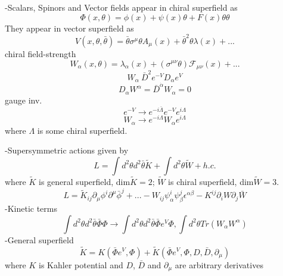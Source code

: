 \documentclass[type = bachelor]{fduthesis-en}
\begin{document}
\bigskip
\noindent-Scalars, Spinors and Vector fields appear in chiral superfield as
\begin{equation}
\Phi(x,\theta)=\phi(x)+\psi(x)\theta+F(x)\theta\theta
\end{equation}
They appear in vector superfield as 
\begin{equation}
V(x, \theta, \bar{\theta})=\bar{\theta}\sigma^{\mu}\theta A_{\mu}(x)+\bar{\theta}^2\theta\lambda(x)+...
\end{equation}
chiral field-strength 
\begin{equation}
W_{\alpha}(x,\theta)=\lambda_{\alpha}(x)+(\sigma^{\mu\nu}\theta)\mathcal{F}_{\mu\nu}(x)+...
\end{equation}
\begin{equation}
W_{\alpha}~\bar{D}^2e^{-V}D_{\alpha}e^V
\end{equation}
\begin{equation}
D_{\alpha}W^{\alpha}=\bar{D}^{\dot{\alpha}}W_{\alpha}=0
\end{equation}
gauge inv.
\begin{equation}
e^{-V} \rightarrow e^{-i\bar{\Lambda}}e^{-V}e^{i\Lambda}
\end{equation}
\begin{equation}
W_{\alpha} \rightarrow e^{-i\Lambda}W_{\alpha}e^{i\Lambda}
\end{equation}
where $\Lambda$ is some chiral superfield.

\bigskip
-Supersymmetric actions given by 
\begin{equation}
L = \int d^2\theta d^2\bar{\theta}\widetilde{K}+\int d^2\theta \widetilde{W}+h.c.
\end{equation}
where $\widetilde{K}$ is general superfield, dim$\widetilde{K}=2$; $\widetilde{W}$ is chiral superfield, dim$\widetilde{W}=3$.
\begin{equation}
L = \widetilde{K}_{ij}\partial_{\mu}\phi^{i}\partial^{\mu}\bar{\phi}^j+...-W_{ij}\psi^i_{\alpha}\psi^j_{\beta}\epsilon^{\alpha\beta}-K^{ij}\partial_iW\partial_j\bar{W}
\end{equation}
-Kinetic terms
\begin{equation}
\int d^2\theta d^2\bar{\theta} \bar{\Phi}\Phi \longrightarrow \int d^2\theta d^2\bar{\theta} \bar{\Phi}e^V\Phi, \int d^2\theta Tr(W_{\alpha}W^{\alpha})
\end{equation}
-General superfield
\begin{equation}
\widetilde{K}=K(\bar{\Phi}e^V, \Phi)+\widetilde{K}(\bar{\Phi}e^V, \Phi, D, \bar{D}, \partial_{\mu})
\end{equation}
where $K$ is Kahler potential and $D$, $\bar{D}$ and $\partial_{\mu}$ are arbitrary derivatives
\end{document}
